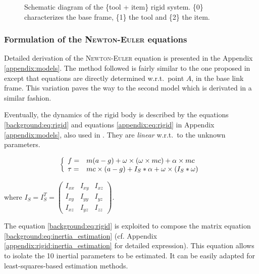 \documentclass[/home/francois/latex/report/main.tex]{subfiles}
\begin{document}
\begin{figure}[h]
\centering
   \caption{Schematic diagram of the \{tool + item\} rigid system. \{0\} characterizes the base frame, \{1\} the tool and \{2\} the item.}
   \label{fig:tikz:one_body}
\end{figure}

\subsubsection{Formulation of the \textsc{Newton-Euler} equations}
\label{subsubsection:background_newton_equation}

Detailed derivation of the \textsc{Newton-Euler} equation is presented in the Appendix \ref{appendix:models}. The method followed is fairly similar to the one proposed in \cite{An1985} except that equations are directly determined w.r.t.\ point $A$, in the base link frame. This variation paves the way to the second model which is derivated in a similar fashion.

Eventually, the dynamics of the rigid body is described by the equations \ref{background:eq:rigid} and equations \ref{appendix:eq:rigid} in Appendix \ref{appendix:models}, also used in \cite{Kubus2008, Kubus2007, Kubus2014, Farsoni2018}. They are \textit{linear} w.r.t.\ to the unknown parameters.

\begin{equation}
 \label{background:eq:rigid}
 \left \{
 \begin{array}{l l}
  f =    & m (a - g) + \omega \times (\omega \times m c) + \alpha \times m c \\
  \tau = & m c \times (a - g)
  + I_{S} \ast \alpha + \omega \times (I_{S} \ast \omega)
 \end{array}
 \right.
\end{equation}

where $I_S = I_S^T =
\begin{pmatrix}
 I_{xx} & I_{xy} & I_{xz} \\
 I_{xy} & I_{yy} & I_{yz} \\
 I_{xz} & I_{yz} & I_{zz}
\end{pmatrix}
$.

The equation \ref{background:eq:rigid} is exploited to compose the matrix equation \ref{background:eq:inertia_estimation} (cf. Appendix \ref{appendix:rigid:inertia_estimation} for detailed expression). This equation allows to isolate the 10 inertial parameters to be estimated. It can be easily adapted for least-squares-based estimation methods.
\end{document}
